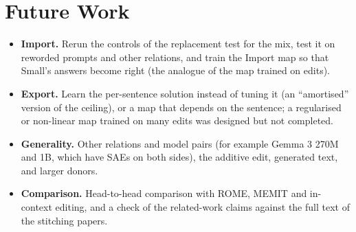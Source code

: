 \section{Future Work}

\begin{itemize}
  \item \textbf{Import.} Rerun the controls of the replacement test for the mix, test it on reworded prompts and other relations, and train the Import map so that Small's answers become right (the analogue of the map trained on edits).
  \item \textbf{Export.} Learn the per-sentence solution instead of tuning it (an ``amortised'' version of the ceiling), or a map that depends on the sentence; a regularised or non-linear map trained on many edits was designed but not completed.
  \item \textbf{Generality.} Other relations and model pairs (for example Gemma 3 270M and 1B, which have SAEs on both sides), the additive edit, generated text, and larger donors.
  \item \textbf{Comparison.} Head-to-head comparison with ROME, MEMIT and in-context editing, and a check of the related-work claims against the full text of the stitching papers.
\end{itemize}
